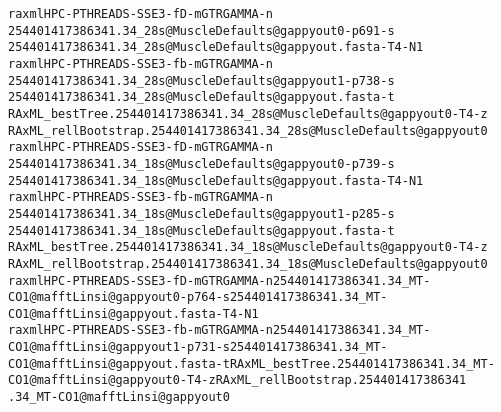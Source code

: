 \documentclass[letterpaper,10pt,english]{/usr/share/sphinx/texinputs/sphinxhowto}
\newenvironment{InvisibleVerbatim}
        {\begin{mdframed}[leftmargin=0.1\linewidth,innerleftmargin=3pt,innerrightmargin=3pt, userdefinedwidth=1\linewidth, linewidth=0pt, linecolor=white, usetwoside=false]}
        {\end{mdframed}}
\begin{document}
    

        
        

            
                \begin{InvisibleVerbatim}
                \vspace{-0.5\baselineskip}
\begin{alltt}raxmlHPC-PTHREADS-SSE3 -f D -m GTRGAMMA -n
254401417386341.34\_28s@MuscleDefaults@gappyout0 -p 691 -s
254401417386341.34\_28s@MuscleDefaults@gappyout.fasta -T 4 -N 1
raxmlHPC-PTHREADS-SSE3 -f b -m GTRGAMMA -n
254401417386341.34\_28s@MuscleDefaults@gappyout1 -p 738 -s
254401417386341.34\_28s@MuscleDefaults@gappyout.fasta -t
RAxML\_bestTree.254401417386341.34\_28s@MuscleDefaults@gappyout0 -T 4 -z
RAxML\_rellBootstrap.254401417386341.34\_28s@MuscleDefaults@gappyout0
raxmlHPC-PTHREADS-SSE3 -f D -m GTRGAMMA -n
254401417386341.34\_18s@MuscleDefaults@gappyout0 -p 739 -s
254401417386341.34\_18s@MuscleDefaults@gappyout.fasta -T 4 -N 1
raxmlHPC-PTHREADS-SSE3 -f b -m GTRGAMMA -n
254401417386341.34\_18s@MuscleDefaults@gappyout1 -p 285 -s
254401417386341.34\_18s@MuscleDefaults@gappyout.fasta -t
RAxML\_bestTree.254401417386341.34\_18s@MuscleDefaults@gappyout0 -T 4 -z
RAxML\_rellBootstrap.254401417386341.34\_18s@MuscleDefaults@gappyout0
raxmlHPC-PTHREADS-SSE3 -f D -m GTRGAMMA -n 254401417386341.34\_MT-
CO1@mafftLinsi@gappyout0 -p 764 -s 254401417386341.34\_MT-
CO1@mafftLinsi@gappyout.fasta -T 4 -N 1
raxmlHPC-PTHREADS-SSE3 -f b -m GTRGAMMA -n 254401417386341.34\_MT-
CO1@mafftLinsi@gappyout1 -p 731 -s 254401417386341.34\_MT-
CO1@mafftLinsi@gappyout.fasta -t RAxML\_bestTree.254401417386341.34\_MT-
CO1@mafftLinsi@gappyout0 -T 4 -z RAxML\_rellBootstrap.254401417386341
.34\_MT-CO1@mafftLinsi@gappyout0
\end{alltt}

            \end{InvisibleVerbatim}
            
        
    


\end{document}
